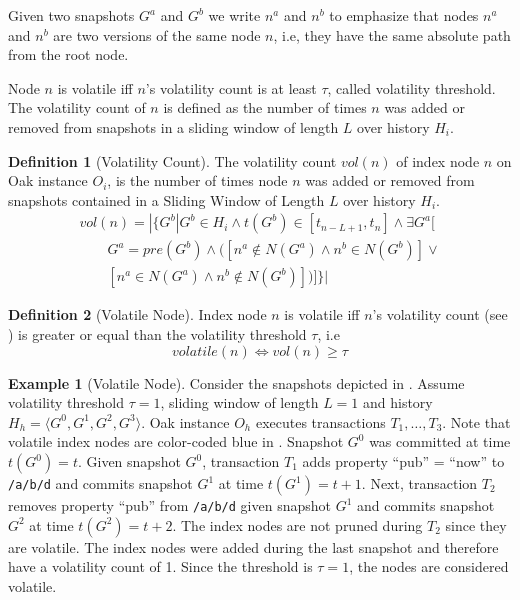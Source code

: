 \documentclass[abstracton,12pt]{scrartcl}
\theoremstyle{definition}
\newtheorem{definition}{Definition}
\newtheorem{example}{Example}
\begin{document}
Given two snapshots $G^a$ and $G^b$ we write $n^a$ and $n^b$ to emphasize that
nodes $n^a$ and $n^b$ are two versions of the same node $n$, i.e, they have
the same absolute path from the root node.

Node $n$ is volatile iff $n$'s volatility count is at least $\tau$, called
volatility threshold. The volatility count of $n$ is defined as the number of
times $n$ was added or removed from snapshots in a sliding window of length
$L$ over history $H_i$.

\begin{definition}[Volatility Count]
  The volatility count $vol(n)$ of index node $n$ on Oak instance $O_i$, is the number of
  times node $n$ was added or removed from snapshots contained in a Sliding
  Window of Length $L$ over history $H_i$.
  \begin{align*}
    vol(n) = | \{ G^b | G^b \in H_i \land t(G^b) \in [t_{n-L+1}, t_n] \land \exists G^a[ \\
    \qquad G^a = pre(G^b) \land ([n^a \notin N(G^a) \land n^b \in N(G^b)]\lor \\
    \qquad [n^a \in N(G^a) \land n^b \notin N(G^b)] )]\} |
  \end{align*}
  \label{def:vol_count}
\end{definition}

\vspace{-4mm}

\begin{definition}[Volatile Node]
  Index node $n$ is volatile iff $n$'s volatility count (see
  ) is greater or equal than the volatility threshold
  $\tau$, i.e
  $$ volatile(n) \iff vol(n) \geq \tau $$
  \label{def:volatile_node}
\end{definition}

\vspace{-4mm}

\begin{example}[Volatile Node]
  Consider the snapshots depicted in . Assume volatility
  threshold $\tau = 1$, sliding window of length $L = 1$ and history $H_h
  = \langle G^0,G^1,G^2,G^3 \rangle$. Oak instance $O_h$ executes transactions
  $T_1, \dots , T_3$. Note that volatile index nodes are color-coded
  blue in . Snapshot $G^0$ was committed at time
  $t(G^0) = t$. Given snapshot $G^0$,
  transaction $T_1$ adds property ``pub'' = ``now'' to
  \texttt{/a/b/d} and commits snapshot $G^1$ at time $t(G^1) = t + 1$. Next,
  transaction $T_2$ removes property ``pub'' from \texttt{/a/b/d} given snapshot
  $G^1$ and commits snapshot $G^2$ at time $t(G^2) = t + 2$. The index nodes are
  not pruned during $T_2$ since they are volatile. The index nodes were added
  during the last snapshot and therefore have a volatility count of 1.
  Since the threshold is $\tau = 1$, the nodes are considered volatile. 
  \label{ex:volatile_node}
\end{example}
\end{document}
